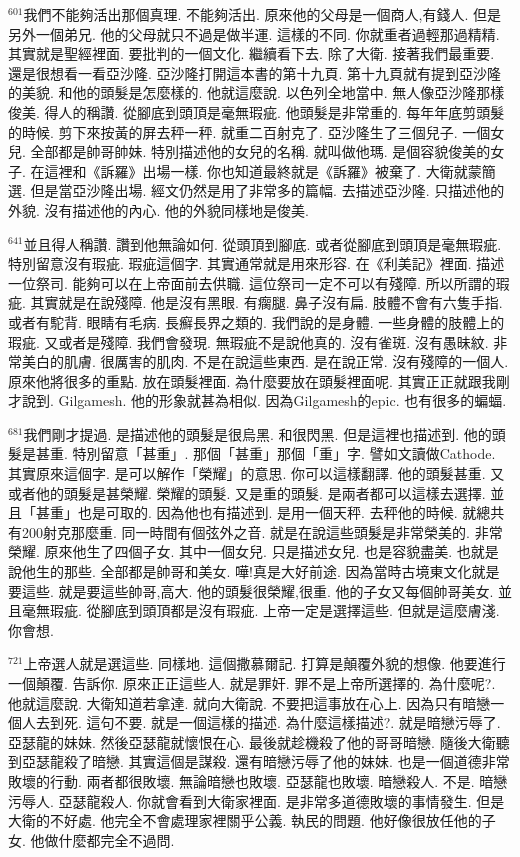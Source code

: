 \documentclass{book}
\begin{document}
$^{601}$我們不能夠活出那個真理.
不能夠活出.
原來他的父母是一個商人,有錢人.
但是另外一個弟兄.
他的父母就只不過是做半運.
這樣的不同.
你就重者過輕那過精精.
其實就是聖經裡面.
要批判的一個文化.
繼續看下去.
除了大衛.
接著我們最重要.
還是很想看一看亞沙隆.
亞沙隆打開這本書的第十九頁.
第十九頁就有提到亞沙隆的美貌.
和他的頭髮是怎麼樣的.
他就這麼說.
以色列全地當中.
無人像亞沙隆那樣俊美.
得人的稱讚.
從腳底到頭頂是毫無瑕疵.
他頭髮是非常重的.
每年年底剪頭髮的時候.
剪下來按黃的屏去秤一秤.
就重二百射克了.
亞沙隆生了三個兒子.
一個女兒.
全部都是帥哥帥妹.
特別描述他的女兒的名稱.
就叫做他瑪.
是個容貌俊美的女子.
在這裡和《訴羅》出場一樣.
你也知道最終就是《訴羅》被棄了.
大衛就蒙簡選.
但是當亞沙隆出場.
經文仍然是用了非常多的篇幅.
去描述亞沙隆.
只描述他的外貌.
沒有描述他的內心.
他的外貌同樣地是俊美.

$^{641}$並且得人稱讚.
讚到他無論如何.
從頭頂到腳底.
或者從腳底到頭頂是毫無瑕疵.
特別留意沒有瑕疵.
瑕疵這個字.
其實通常就是用來形容.
在《利美記》裡面.
描述一位祭司.
能夠可以在上帝面前去供職.
這位祭司一定不可以有殘障.
所以所謂的瑕疵.
其實就是在說殘障.
他是沒有黑眼.
有瘸腿.
鼻子沒有扁.
肢體不會有六隻手指.
或者有駝背.
眼睛有毛病.
長癬長界之類的.
我們說的是身體.
一些身體的肢體上的瑕疵.
又或者是殘障.
我們會發現.
無瑕疵不是說他真的.
沒有雀斑.
沒有愚昧紋.
非常美白的肌膚.
很厲害的肌肉.
不是在說這些東西.
是在說正常.
沒有殘障的一個人.
原來他將很多的重點.
放在頭髮裡面.
為什麼要放在頭髮裡面呢.
其實正正就跟我剛才說到.
Gilgamesh.
他的形象就甚為相似.
因為Gilgamesh的epic.
也有很多的蝙蝠.

$^{681}$我們剛才提過.
是描述他的頭髮是很烏黑.
和很閃黑.
但是這裡也描述到.
他的頭髮是甚重.
特別留意「甚重」.
那個「甚重」那個「重」字.
譬如文讀做Cathode.
其實原來這個字.
是可以解作「榮耀」的意思.
你可以這樣翻譯.
他的頭髮甚重.
又或者他的頭髮是甚榮耀.
榮耀的頭髮.
又是重的頭髮.
是兩者都可以這樣去選擇.
並且「甚重」也是可取的.
因為他也有描述到.
是用一個天秤.
去秤他的時候.
就總共有200射克那麼重.
同一時間有個弦外之音.
就是在說這些頭髮是非常榮美的.
非常榮耀.
原來他生了四個子女.
其中一個女兒.
只是描述女兒.
也是容貌盡美.
也就是說他生的那些.
全部都是帥哥和美女.
嘩!真是大好前途.
因為當時古境東文化就是要這些.
就是要這些帥哥,高大.
他的頭髮很榮耀,很重.
他的子女又每個帥哥美女.
並且毫無瑕疵.
從腳底到頭頂都是沒有瑕疵.
上帝一定是選擇這些.
但就是這麼膚淺.
你會想.

$^{721}$上帝選人就是選這些.
同樣地.
這個撒慕爾記.
打算是顛覆外貌的想像.
他要進行一個顛覆.
告訴你.
原來正正這些人.
就是罪奸.
罪不是上帝所選擇的.
為什麼呢?.
他就這麼說.
大衛知道若拿達.
就向大衛說.
不要把這事放在心上.
因為只有暗戀一個人去到死.
這句不要.
就是一個這樣的描述.
為什麼這樣描述?.
就是暗戀污辱了.
亞瑟龍的妹妹.
然後亞瑟龍就懷恨在心.
最後就趁機殺了他的哥哥暗戀.
隨後大衛聽到亞瑟龍殺了暗戀.
其實這個是謀殺.
還有暗戀污辱了他的妹妹.
也是一個道德非常敗壞的行動.
兩者都很敗壞.
無論暗戀也敗壞.
亞瑟龍也敗壞.
暗戀殺人.
不是.
暗戀污辱人.
亞瑟龍殺人.
你就會看到大衛家裡面.
是非常多道德敗壞的事情發生.
但是大衛的不好處.
他完全不會處理家裡關乎公義.
執民的問題.
他好像很放任他的子女.
他做什麼都完全不過問.
\end{document}
